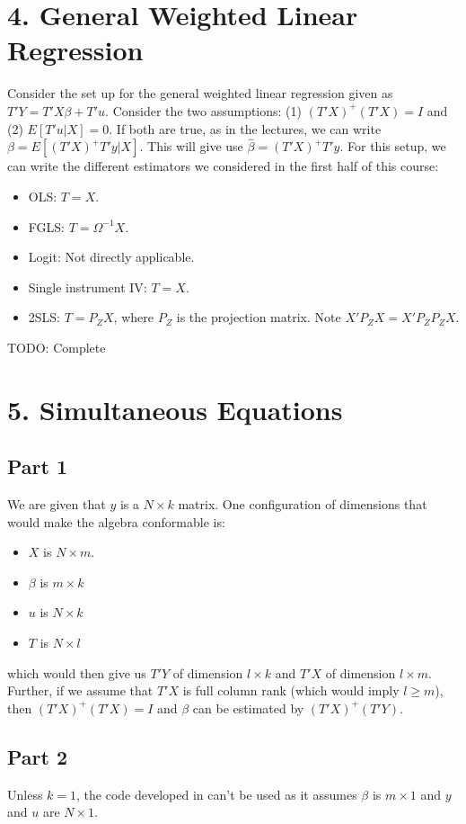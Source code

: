 \documentclass[10pt]{report}
\begin{document}
\section*{4. General Weighted Linear Regression}
Consider the set up for the general weighted linear regression given as $T'Y = T'X \beta + T' u$. Consider the two assumptions: (1) $(T'X)^+ (T'X) = I$ and (2) $E[T'u|X] = 0$. If both are true, as in the lectures, we can write $\beta = E[(T'X)^+ T'y | X]$. This will give use $\hat{\beta} = (T'X)^+ T'y$. For this setup, we can write the different estimators we considered in the first half of this course:
\begin{itemize}
    \item OLS: $T = X$.
    \item FGLS: $T = \Omega^{-1} X$.
    \item Logit: Not directly applicable.
    \item Single instrument IV: $T = X$.
    \item 2SLS: $T = P_Z X $, where $P_Z$ is the projection matrix. Note $X' P_Z X = X' P_Z P_Z X$.
\end{itemize}

TODO: Complete

\section*{5. Simultaneous Equations}
\subsection*{Part 1}
We are given that $y$ is a $N\times k$ matrix. One configuration of dimensions that would make the algebra conformable is:
\begin{itemize}
    \item $X$ is $N \times m$.
    \item $\beta$ is $m \times k$
    \item $u$ is $N \times k$
    \item $T$ is $N \times l$
\end{itemize}

\noindent which would then give us $T'Y$ of dimension $l \times k$ and $T'X$ of dimension $l \times m$. Further, if we assume that $T'X$ is full column rank (which would imply $l\geq m$), then $(T'X)^+(T'X)= I$ and $\beta$ can be estimated by $(T'X)^+(T'Y)$.

\subsection*{Part 2}
Unless $k=1$, the code developed in  can't be used as it assumes $\beta$ is $m \times 1$ and $y$ and $u$ are $N \times 1$.
\end{document}
